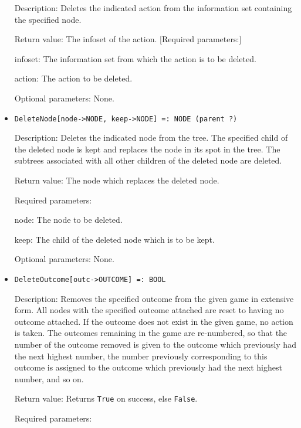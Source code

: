 \begin{itemize}
\bd
\item
[Description:] Deletes the indicated action from the
information set containing the specified node.
\item
[Return value:] The infoset of the action.  [Required parameters:]\hfil\null
	
\bd
\item
[infoset:] The information set from which the action is to be deleted.
\item [action:] The action to be deleted.
\ed

\item
[Optional parameters:] None.
\ed

\item
\protect \large \begin{verbatim}
DeleteNode[node->NODE, keep->NODE] =: NODE (parent ?)  
\end{verbatim}\normalsize

\bd
\item   
[Description:] Deletes the indicated node from the tree.  The
specified child of the deleted node is kept and replaces the node in
its spot in the tree.  The subtrees associated with all other children
of the deleted node are deleted.
\item
[Return value:] The node which replaces the deleted node.
\item
[Required parameters:]\hfil\null
	
\bd
\item
[node:] The node to be deleted.
\item
[keep:] The child of the deleted node which is to be kept.
\ed

\item
[Optional parameters:] None.
\ed

\item
\protect \large \begin{verbatim}
DeleteOutcome[outc->OUTCOME] =: BOOL
\end{verbatim}\normalsize

\bd
\item
[Description:] Removes the specified outcome from the given game in
extensive form.  All nodes with the specified outcome attached are
reset to having no outcome attached.  If the outcome does not exist in
the given game, no action is taken.  The outcomes remaining in the
game are re-numbered, so that the number of the outcome removed is
given to the outcome which previously had the next highest number, the
number previously corresponding to this outcome is assigned to the
outcome which previously had the next highest number, and so on.
\item  
[Return value:] Returns \verb+True+ on success, else \verb+False+.  
\item
[Required parameters:]\hfil\null
	

\end{itemize}

